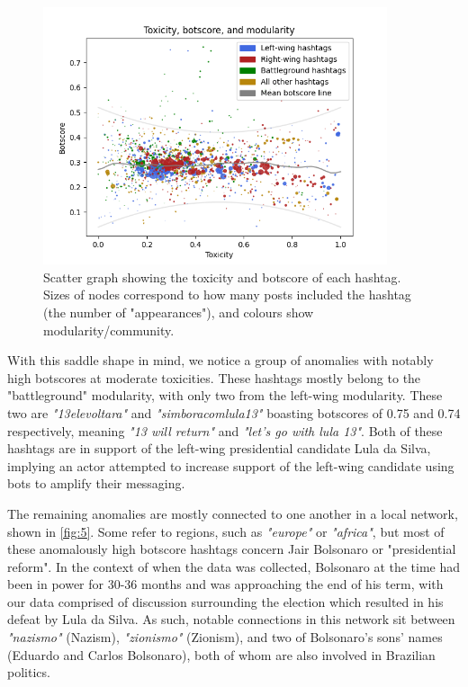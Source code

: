 \documentclass[a4paper,11pt]{article}  %
\begin{document}
	\begin{figure}%
		\begin{center}
			\includegraphics[width=0.9\textwidth]{images/plt_tox_bot_mod}
		\end{center}
		\caption{Scatter graph showing the toxicity and botscore of each hashtag. Sizes of nodes correspond to how many posts included the hashtag (the number of "appearances"), and colours show modularity/community.}
		\label{fig:4}
	\end{figure}

	With this saddle shape in mind, we notice a group of anomalies with notably high botscores at moderate toxicities. These hashtags mostly belong to the "battleground" modularity, with only two from the left-wing modularity. These two are \textit{"13elevoltara"} and \textit{"simboracomlula13"} boasting botscores of 0.75 and 0.74 respectively, meaning \textit{"13 will return"} and \textit{"let's go with lula 13"}. Both of these hashtags are in support of the left-wing presidential candidate Lula da Silva, implying an actor attempted to increase support of the left-wing candidate using bots to amplify their messaging. 
	
	The remaining anomalies are mostly connected to one another in a local network, shown in \autoref{fig:5}. Some refer to regions, such as \textit{"europe"} or \textit{"africa"}, but most of these anomalously high botscore hashtags concern Jair Bolsonaro or "presidential reform". In the context of when the data was collected, Bolsonaro at the time had been in power for 30-36 months and was approaching the end of his term, with our data comprised of discussion surrounding the election which resulted in his defeat by Lula da Silva. As such, notable connections in this network sit between \textit{"nazismo"} (Nazism), \textit{"zionismo"} (Zionism), and two of Bolsonaro's sons' names (Eduardo and Carlos Bolsonaro), both of whom are also involved in Brazilian politics. 
	
\end{document}
